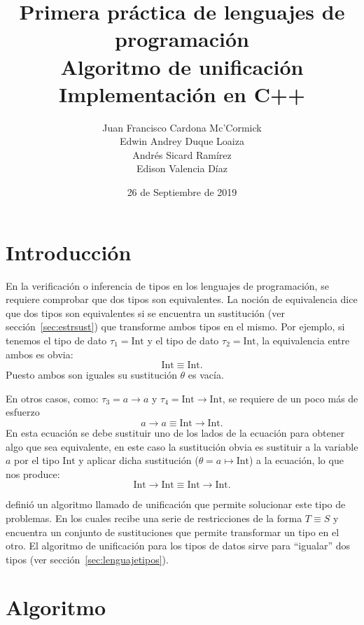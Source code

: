 \documentclass{article}
\title{Primera práctica de lenguajes de programación\\Algoritmo de unificación\\Implementación en C++}
\date{26 de Septiembre de 2019}
\author{%
  Juan Francisco Cardona Mc'Cormick%
  \\
  Edwin Andrey Duque Loaiza%
  \\
  Andrés Sicard Ramírez%
  \\
  Edison Valencia Díaz%
}
\theoremstyle{definition}
\begin{document}
\maketitle{}

\section{Introducción}
\label{sec:Introduccion}

En la verificación o inferencia de tipos en los lenguajes de
programación, se requiere comprobar que dos tipos son equivalentes. La
noción de equivalencia dice que dos tipos son equivalentes si se
encuentra un sustitución (ver sección~\ref{sec:estrsust}) que
transforme ambos tipos en el mismo. Por ejemplo, si tenemos el tipo de
dato $\tau_1 = \text{Int}$ y el tipo de dato $\tau_2 = \text{Int}$, la
equivalencia entre ambos es obvia:
\begin{equation*}
  \text{Int} \equiv \text{Int}.
\end{equation*}
Puesto ambos son iguales su sustitución $\theta$ es vacía.

En otros casos, como: $\tau_3 = a \to a$ y $\tau_4 = \text{Int}
\to \text{Int}$, se requiere de un poco más de esfuerzo
\begin{equation*}
  a \to a \equiv \text{Int} \to \text{Int}.
\end{equation*}
En esta ecuación se debe sustituir uno de los lados de la ecuación
para obtener algo que sea equivalente, en este caso la sustitución
obvia es sustituir a la variable $a$ por el tipo $\text{Int}$ y
aplicar dicha sustitución ($\theta = a \mapsto \text{Int}$) a la
ecuación, lo que nos produce:
\begin{equation*}
  \text{Int} \to \text{Int} \equiv \text{Int} \to \text{Int}.
\end{equation*}

\textcite{robinson-1971} definió un algoritmo llamado de unificación
que permite solucionar este tipo de problemas. En los cuales recibe
una serie de restricciones de la forma $T \equiv S$ y encuentra un
conjunto de sustituciones que permite transformar un tipo en el
otro. El algoritmo de unificación para los tipos de datos sirve para
``igualar'' dos tipos (ver sección~\ref{sec:lenguajetipos}).

\section{Algoritmo}\label{sec:algoritmo}
\end{document}
